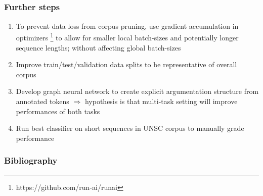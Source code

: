 \documentclass{beamer}
\begin{document}
\subsection{}
\begin{framefont}{\footnotesize}
	\begin{frame}
		\frametitle{Further steps}
		\begin{enumerate}
		[square]
			\setlength\itemsep{1.2em}
			\item To prevent data loss from corpus pruning, use gradient accumulation in optimizers \footnote{https://github.com/run-ai/runai} to allow for smaller local batch-sizes and potentially longer sequence lengths; without affecting global batch-sizes
			\item Improve train/test/validation data splits to be representative of overall corpus
			\item Develop graph neural network to create explicit argumentation structure from annotated tokens $\Longrightarrow$ hypothesis is that multi-task setting will improve performances of both tasks
			\item Run best classifier on short sequences in UNSC corpus to manually grade performance
		\end{enumerate}
	\end{frame}
\end{framefont}

\begin{frame}[allowframebreaks]
	\frametitle{Bibliography}
	\nocite{*}
	\printbibliography[title = {Bibliography}]
\end{frame}
\end{document}
